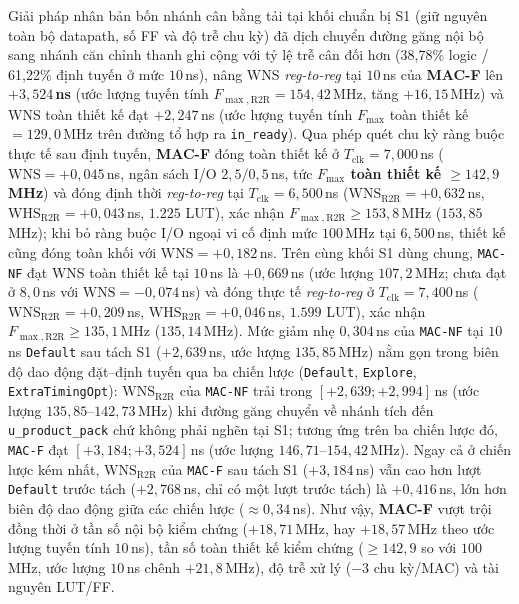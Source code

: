 Giải pháp nhân bản bốn nhánh cân bằng tải tại khối chuẩn bị S1 (giữ nguyên toàn
bộ datapath, số FF và độ trễ chu kỳ) đã dịch chuyển đường găng nội bộ sang nhánh
căn chỉnh thanh ghi cộng với tỷ lệ trễ cân đối hơn (38,78\% logic / 61,22\% định
tuyến ở mức $10$\,ns), nâng WNS \textit{reg-to-reg} tại $10$\,ns của \textbf{MAC-F}
lên \textbf{$+3{,}524$\,ns} (ước lượng tuyến tính $F_{\max,\mathrm{R2R}} = 154{,}42$\,MHz,
tăng $+16{,}15$\,MHz) và WNS toàn thiết kế đạt $+2{,}247$\,ns (ước lượng tuyến tính
$F_{\max}$ toàn thiết kế $= 129{,}0$\,MHz trên đường tổ hợp ra \texttt{in\_ready}). Qua phép
quét chu kỳ ràng buộc thực tế sau định tuyến, \textbf{MAC-F} đóng toàn thiết kế ở
$T_{\mathrm{clk}}=7{,}000$\,ns ($\mathrm{WNS}=+0{,}045$\,ns, ngân sách I/O $2{,}5/0{,}5$\,ns,
tức \textbf{$F_{\max}$ toàn thiết kế $\ge 142{,}9$\,MHz}) và đóng định thời \textit{reg-to-reg} tại
$T_{\mathrm{clk}}=6{,}500$\,ns ($\mathrm{WNS}_{\mathrm{R2R}}=+0{,}632$\,ns,
$\mathrm{WHS}_{\mathrm{R2R}}=+0{,}043$\,ns, $1.225$ LUT), xác nhận
$F_{\max,\mathrm{R2R}} \ge 153{,}8$\,MHz ($153{,}85$\,MHz); khi bỏ ràng buộc I/O ngoại
vi cố định mức $100$\,MHz tại $6{,}500$\,ns, thiết kế cũng đóng toàn khối với
$\mathrm{WNS}=+0{,}182$\,ns. Trên cùng khối S1 dùng chung, \texttt{MAC-NF} đạt WNS toàn
thiết kế tại $10$\,ns là $+0{,}669$\,ns (ước lượng $107{,}2$\,MHz; chưa đạt ở $8{,}0$\,ns với
$\mathrm{WNS}=-0{,}074$\,ns) và đóng thực tế \textit{reg-to-reg} ở $T_{\mathrm{clk}}=7{,}400$\,ns
($\mathrm{WNS}_{\mathrm{R2R}}=+0{,}209$\,ns, $\mathrm{WHS}_{\mathrm{R2R}}=+0{,}046$\,ns,
$1.599$ LUT), xác nhận $F_{\max,\mathrm{R2R}} \ge 135{,}1$\,MHz ($135{,}14$\,MHz). Mức giảm
nhẹ $0{,}304$\,ns của \texttt{MAC-NF} tại $10$\,ns \texttt{Default} sau tách S1
($+2{,}639$\,ns, ước lượng $135{,}85$\,MHz) nằm gọn trong biên độ dao động đặt--định
tuyến qua ba chiến lược (\texttt{Default}, \texttt{Explore}, \texttt{ExtraTimingOpt}):
$\mathrm{WNS}_{\mathrm{R2R}}$ của \texttt{MAC-NF} trải trong $[+2{,}639; +2{,}994]$\,ns
(ước lượng $135{,}85\text{--}142{,}73$\,MHz) khi đường găng chuyển về nhánh tích đến
\texttt{u\_product\_pack} chứ không phải nghẽn tại S1; tương ứng trên ba chiến lược đó,
\texttt{MAC-F} đạt $[+3{,}184; +3{,}524]$\,ns (ước lượng $146{,}71\text{--}154{,}42$\,MHz).
Ngay cả ở chiến lược kém nhất, $\mathrm{WNS}_{\mathrm{R2R}}$ của \texttt{MAC-F} sau
tách S1 ($+3{,}184$\,ns) vẫn cao hơn lượt \texttt{Default} trước tách ($+2{,}768$\,ns,
chỉ có một lượt trước tách) là $+0{,}416$\,ns, lớn hơn biên độ dao động giữa các
chiến lược ($\approx 0{,}34$\,ns). Như vậy, \textbf{MAC-F} vượt trội đồng thời ở tần
số nội bộ kiểm chứng ($+18{,}71$\,MHz, hay $+18{,}57$\,MHz theo ước lượng tuyến tính $10$\,ns),
tần số toàn thiết kế kiểm chứng ($\ge 142{,}9$ so với $100$\,MHz, ước lượng $10$\,ns
chênh $+21{,}8$\,MHz), độ trễ xử lý ($-3$ chu kỳ/MAC) và tài nguyên LUT/FF.

